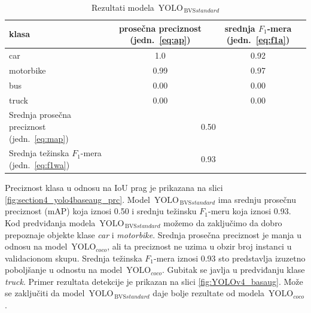 \documentclass[12pt,oneside]{memoir}
\newcommand{\yolo}{\ensuremath{\,\textrm{YOLO}}}
\newcommand{\bvs}{\ensuremath{\,\textrm{BVS}}}
\begin{document}
\begin{table}
    \begin{center}
    \caption{Rezultati modela $\yolo_{\bvs{standard}}$}
        \begin{tabular}{|m{10em}|c|c|}
        \toprule
        klasa     & prosečna preciznost (jedn.~\ref{eq:ap}) & srednja $F_1$-mera (jedn.~\ref{eq:f1a})  \\ \hline
        \midrule
        car       & 1.0  & 0.92 \\ \hline
        motorbike & 0.99   & 0.97 \\ \hline
        bus       & 0.00   & 0.00 \\ \hline
        truck     & 0.00   & 0.00 \\ \hline
        \bottomrule
        Srednja prosečna preciznost (jedn.~\ref{eq:map}) & \multicolumn{2}{c|}{0.50}  \\ \hline
        Srednja težinska $F_1$-mera (jedn.~\ref{eq:f1wa}) & \multicolumn{2}{c|}{0.93}  \\ \hline
    \end{tabular}
    \label{tab:section4_yolo4baseaug_results}
    \end{center}
\end{table}

Preciznost klasa u odnosu na IoU prag je prikazana na slici \ref{fig:section4_yolo4baseaug_prc}. Model  $\yolo_{\bvs{standard}}$ ima srednju prosečnu preciznost (mAP) koja iznosi 0.50 i srednju težinsku $F_1$-meru koja iznosi 0.93. Kod predviđanja modela  $\yolo_{\bvs{standard}}$ možemo da zaključimo da dobro prepoznaje objekte klase \textit{car} i \textit{motorbike}. Srednja prosečna preciznost je manja u odnosu na model $\yolo_{coco}$, ali ta preciznost ne uzima u obzir broj instanci u validacionom skupu. Srednja težinska $F_1$-mera iznosi 0.93 sto predstavlja izuzetno poboljšanje u odnostu na model $\yolo_{coco}$. Gubitak se javlja u predviđanju klase \textit{truck}. Primer rezultata detekcije je prikazan na slici \ref{fig:YOLOv4_basaug}. Može se zaključiti da model  $\yolo_{\bvs{standard}}$ daje bolje rezultate od modela $\yolo_{coco}$.
\end{document}

